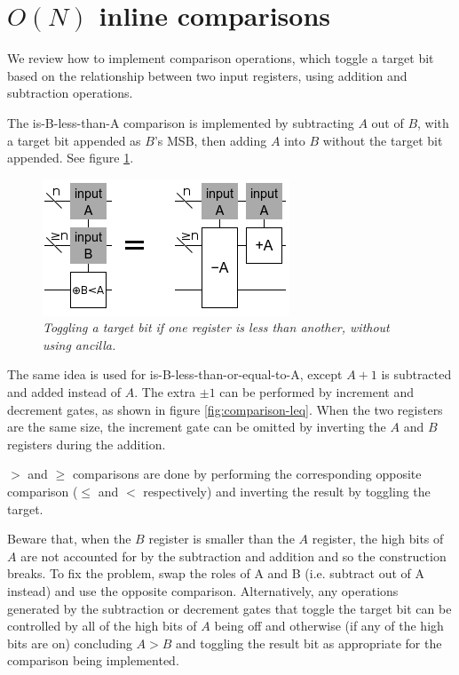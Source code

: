 \documentclass[twocolumn]{article}
\begin{document}
\section{$O(N)$ inline comparisons}

We review how to implement comparison operations, which toggle a target bit based on the relationship between two input registers, using addition and subtraction operations.

The is-B-less-than-A comparison is implemented by subtracting $A$ out of $B$, with a target bit appended as $B$'s MSB, then adding $A$ into $B$ without the target bit appended.
See figure \ref{fig:comparison-less}.

\begin{figure}
  \centering
  \includegraphics[totalheight=3cm]{comparison-less.png}
  \caption{\em Toggling a target bit if one register is less than another, without using ancilla.}
  \label{fig:comparison-less}
\end{figure}

The same idea is used for is-B-less-than-or-equal-to-A, except $A+1$ is subtracted and added instead of $A$.
The extra $\pm 1$ can be performed by increment and decrement gates, as shown in figure \ref{fig:comparison-leq}.
When the two registers are the same size, the increment gate can be omitted by inverting the $A$ and $B$ registers during the addition.

$>$ and $\geq$ comparisons are done by performing the corresponding opposite comparison ($\leq$ and $<$ respectively) and inverting the result by toggling the target.

Beware that, when the $B$ register is smaller than the $A$ register, the high bits of $A$ are not accounted for by the subtraction and addition and so the construction breaks.
To fix the problem, swap the roles of A and B (i.e. subtract out of A instead) and use the opposite comparison.
Alternatively, any operations generated by the subtraction or decrement gates that toggle the target bit can be controlled by all of the high bits of $A$ being off and otherwise (if any of the high bits are on) concluding $A>B$ and toggling the result bit as appropriate for the comparison being implemented.
\end{document}
